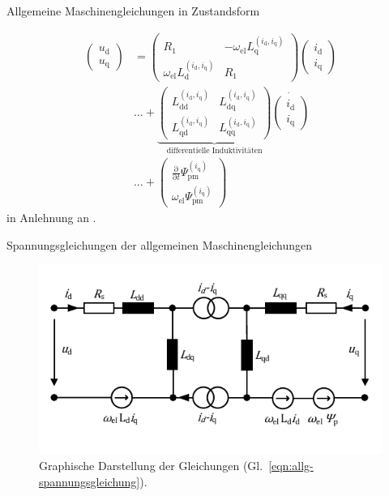 \documentclass{beamer}
\newcommand{\x}[1]{\mathrm{#1}}
\begin{document}
\begin{frame}{Allgemeine Maschinengleichungen in Zustandsform}

\begin{align}
\left( \begin{array}{c} u_\x{d} \\ u_\x{q} \end{array} \right) &= \left( \begin{array}{cc} R_\x{1} & -\omega_\x{el}L_\x{q}^{(i_\x{d},i_\x{q})} \\ \omega_\x{el}L_\x{d}^{(i_\x{d},i_\x{q})} & R_\x{1} \end{array} \right) \left(\begin{array}{c} i_\x{d} \\ i_\x{q} \end{array}\right) \label{eqn:allg-spannungsgleichung} \\ 
 &\ldots + \underbrace{\left( \begin{array}{cc} L_\x{dd}^{(i_\x{d},i_\x{q})} & L_\x{dq}^{(i_\x{d},i_\x{q})} \\ L_\x{qd}^{(i_\x{d},i_\x{q})} & L_\x{qq}^{(i_\x{d},i_\x{q})} \end{array}\right)}_{\text{differentielle Induktivitäten}} \dot{\left(\begin{array}{c} i_\x{d} \\ i_\x{q} \end{array} \right)} \nonumber \\ 
& \ldots + \left( \begin{array}{c} \frac{\x{\partial}}{\x{\partial }t} \Psi_\x{pm}^{(i_\x{q})} \\ \omega_\x{el} \Psi_\x{pm}^{(i_\x{q})} \nonumber \end{array}  \right) \nonumber
\end{align}
in Anlehnung an \autocite{Kellner2012}.
\end{frame}

\begin{frame}[plain]{Spannungsgleichungen der allgemeinen Maschinengleichungen}
\begin{figure}[!h]
\centering
\includegraphics[width=\textwidth]{img/allg-spannungsgleichung}
\caption{Graphische Darstellung der Gleichungen (Gl.~\ref{eqn:allg-spannungsgleichung}).}
\label{fig:allg-spannungsgleichung}
\end{figure}
\end{frame}
\end{document}

